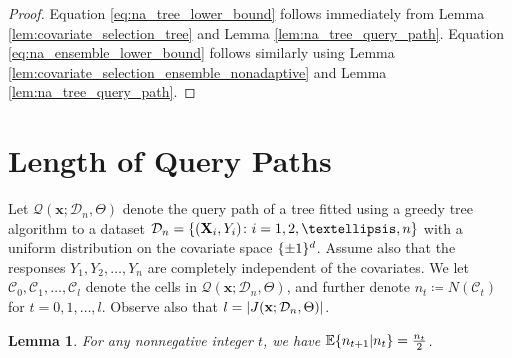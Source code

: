 \documentclass[11pt]{article}
\newtheorem{lemma}[theorem]{Lemma}
\newcommand{\bx}{\mathbf{x}}
\newcommand{\bX}{\mathbf{X}}
\DeclarePairedDelimiter{\braces}{\lbrace}{\rbrace}
\DeclarePairedDelimiter{\abs}{|}{|}
\newcommand{\E}{\mathbb{E}}
\newcommand{\cell}{\mathcal{C}}
\newcommand{\node}{\mathfrak{t}}
\newcommand{\binspace}{\braces{\pm 1}^\nfeats}
\newcommand{\nfeats}{d}
\newcommand{\nsamples}{n}
\newcommand{\data}[1][n]{\mathcal{D}_{#1}}
\newcommand{\suppset}{S^*}
\newcommand{\querypath}{\mathcal{Q}}
\begin{document}
\begin{proof}
    Equation \eqref{eq:na_tree_lower_bound} follows immediately from Lemma \ref{lem:covariate_selection_tree} and Lemma \ref{lem:na_tree_query_path}.
    Equation \eqref{eq:na_ensemble_lower_bound} follows similarly using Lemma \ref{lem:covariate_selection_ensemble_nonadaptive} and Lemma \ref{lem:na_tree_query_path}.
\end{proof}



\section{Length of Query Paths}
\label{sec:query_path_length}

Let $\querypath(\bx;\data,\Theta)$ denote the query path of a tree fitted using a greedy tree algorithm to a dataset $\data = \braces*{(\bX_i,Y_i) \colon i = 1,2,\ldots,\nsamples}$ with a uniform distribution on the covariate space $\binspace$.
Assume also that the responses $Y_1,Y_2,\ldots,Y_\nsamples$ are completely independent of the covariates.
We let $\cell_0, \cell_1,\ldots,\cell_l$ denote the cells in $\querypath(\bx;\data,\Theta)$, and further denote $n_t \coloneqq N(\cell_t)$ for $t=0,1,\ldots,l$.
Observe also that $l = \abs*{J(\bx;\data,\Theta)}$.

\begin{lemma}
    \label{lem:conditional_expectation_for_node_no_of_samples}
    For any nonnegative integer $t$, we have $\E\braces*{n_{t+1}|n_{t}} = \frac{n_{t}}{2}$.
\end{lemma}
\end{document}
